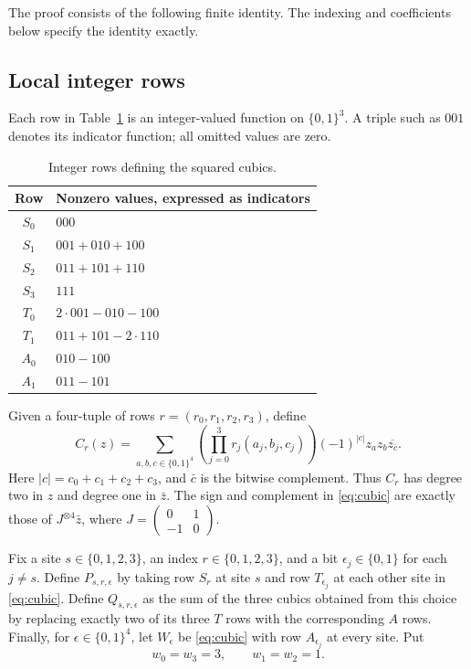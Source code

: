 \documentclass[11pt]{article}
\theoremstyle{definition}
\theoremstyle{remark}
\newcommand{\conj}[1]{\overline{#1}}
\begin{document}
The proof consists of the following finite identity. The indexing and coefficients below specify the identity exactly.

\subsection{Local integer rows}

Each row in Table~\ref{tab:rows} is an integer-valued function on
$\{0,1\}^3$. A triple such as $001$ denotes its indicator function;
all omitted values are zero.

\begin{table}[ht]
\centering
\begin{tabular}{@{}cl@{}}
\toprule
Row & Nonzero values, expressed as indicators\\
\midrule
$S_0$ & $000$\\
$S_1$ & $001+010+100$\\
$S_2$ & $011+101+110$\\
$S_3$ & $111$\\
$T_0$ & $2\cdot001-010-100$\\
$T_1$ & $011+101-2\cdot110$\\
$A_0$ & $010-100$\\
$A_1$ & $011-101$\\
\bottomrule
\end{tabular}
\caption{Integer rows defining the squared cubics.}
\label{tab:rows}
\end{table}

Given a four-tuple of rows $r=(r_0,r_1,r_2,r_3)$, define
\begin{equation}
 C_r(z)=\sum_{a,b,c\in\{0,1\}^4}
       \left(\prod_{j=0}^3 r_j(a_j,b_j,c_j)\right)
       (-1)^{|c|}z_a z_b\conj{z_{\bar c}}.
 \label{eq:cubic}
\end{equation}
Here $|c|=c_0+c_1+c_2+c_3$, and $\bar c$ is the bitwise complement.
Thus $C_r$ has degree two in $z$ and degree one in $\bar z$.
The sign and complement in \eqref{eq:cubic} are exactly those of
$J^{\otimes4}\bar z$, where
$J=\left(\begin{smallmatrix}0&1\\-1&0\end{smallmatrix}\right)$.

Fix a site $s\in\{0,1,2,3\}$, an index $r\in\{0,1,2,3\}$, and a bit
$\epsilon_j\in\{0,1\}$ for each $j\ne s$. Define
$P_{s,r,\epsilon}$ by taking row $S_r$ at site $s$ and row
$T_{\epsilon_j}$ at each other site in \eqref{eq:cubic}. Define
$Q_{s,r,\epsilon}$ as the sum of the three cubics obtained from this
choice by replacing exactly two of its three $T$ rows with the
corresponding $A$ rows. Finally, for $\epsilon\in\{0,1\}^4$, let
$W_\epsilon$ be \eqref{eq:cubic} with row $A_{\epsilon_j}$ at every
site. Put
\begin{equation}
 w_0=w_3=3,\qquad w_1=w_2=1.
 \label{eq:weights}
\end{equation}
\end{document}
